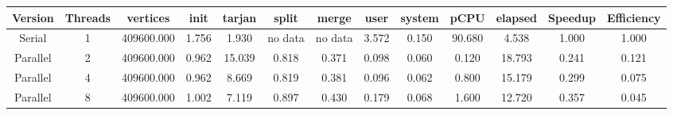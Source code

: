\begin{tabular}{|c|c|c|c|c|c|c|c|c|c|c|c|c|}
\toprule
 Version &  Threads &   vertices &  init &  tarjan &   split &   merge &  user &  system &   pCPU &  elapsed &  Speedup &  Efficiency \\
\midrule
  Serial &        1 & 409600.000 & 1.756 &   1.930 & no data & no data & 3.572 &   0.150 & 90.680 &    4.538 &    1.000 &       1.000 \\
Parallel &        2 & 409600.000 & 0.962 &  15.039 &   0.818 &   0.371 & 0.098 &   0.060 &  0.120 &   18.793 &    0.241 &       0.121 \\
Parallel &        4 & 409600.000 & 0.962 &   8.669 &   0.819 &   0.381 & 0.096 &   0.062 &  0.800 &   15.179 &    0.299 &       0.075 \\
Parallel &        8 & 409600.000 & 1.002 &   7.119 &   0.897 &   0.430 & 0.179 &   0.068 &  1.600 &   12.720 &    0.357 &       0.045 \\
\bottomrule
\end{tabular}
